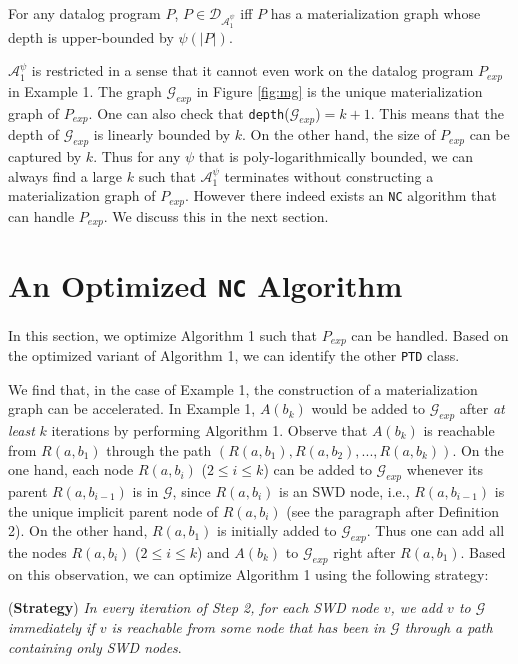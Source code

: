 \documentclass{article}
\begin{document}
\begin{theorem}
For any datalog program $P$, $P\in\mathcal{D}_{\mathcal{A}_1^{\psi}}$ iff $P$ has a materialization graph whose depth is upper-bounded by $\psi(|P|)$.
\end{theorem}

$\mathcal{A}_1^{\psi}$ is restricted in a sense that it cannot even work on the datalog program $P_{exp}$ in Example 1. The graph $\mathcal{G}_{exp}$ in Figure \ref{fig:mg} is the unique materialization graph of $P_{exp}$. One can also check that \texttt{depth}($\mathcal{G}_{exp}$)$=k+1$. This means that the depth of $\mathcal{G}_{exp}$ is linearly bounded by $k$. On the other hand, the size of $P_{exp}$ can be captured by $k$. Thus for any $\psi$ that is poly-logarithmically bounded, we can always find a large $k$ such that $\mathcal{A}_1^{\psi}$ terminates without constructing a materialization graph of $P_{exp}$. However there indeed exists an \texttt{NC} algorithm that can handle $P_{exp}$. We discuss this in the next section.

\section{An Optimized \texttt{NC} Algorithm}

In this section, we optimize Algorithm 1 such that $P_{exp}$
can be handled. Based on the optimized variant of Algorithm 1, we can identify the other \texttt{PTD} class.

We find that, in the case of Example 1, the construction of a materialization graph can be accelerated.
In Example 1, $A(b_k)$ would be added to $\mathcal{G}_{exp}$ after \emph{at least} $k$ iterations by performing Algorithm 1. Observe that $A(b_k)$ is reachable from $R(a,b_1)$ through the path $(R(a,b_1),R(a,b_2),...,R(a,b_k))$. On the one hand, each node $R(a,b_i)$ ($2\leq i\leq k$) can be added to $\mathcal{G}_{exp}$ whenever its parent $R(a,b_{i-1})$ is in $\mathcal{G}$, since $R(a,b_i)$ is an SWD node, i.e., $R(a,b_{i-1})$ is the unique implicit parent node of $R(a,b_{i})$ (see the paragraph after Definition 2). On the other hand, $R(a,b_1)$ is initially added to $\mathcal{G}_{exp}$. Thus one can add all the nodes $R(a,b_i)$ ($2\leq i\leq k$) and $A(b_k)$ to $\mathcal{G}_{exp}$ right after $R(a,b_1)$.
Based on this observation, we can optimize Algorithm 1 using the following strategy:

(\textbf{Strategy}) \emph{In every iteration of Step 2, for each SWD node $v$, we add $v$ to $\mathcal{G}$ immediately if $v$ is reachable from some node that has been in $\mathcal{G}$ through a path containing only SWD nodes}.
\end{document}
